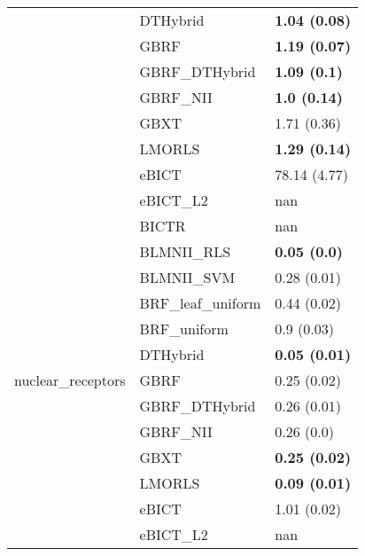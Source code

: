 \begin{tabular}{lll}
 & DTHybrid & \textbf{1.04 (0.08)} \\
 & GBRF & \textbf{1.19 (0.07)} \\
 & GBRF\_DTHybrid & \textbf{1.09 (0.1)} \\
 & GBRF\_NII & \textbf{1.0 (0.14)} \\
 & GBXT & 1.71 (0.36) \\
 & LMORLS & \textbf{1.29 (0.14)} \\
 & eBICT & 78.14 (4.77) \\
 & eBICT\_L2 & nan \\
\cline{1-2}
\multirow[c]{13}{*}{nuclear\_receptors} & BICTR & nan \\
 & BLMNII\_RLS & \textbf{0.05 (0.0)} \\
 & BLMNII\_SVM & 0.28 (0.01) \\
 & BRF\_leaf\_uniform & 0.44 (0.02) \\
 & BRF\_uniform & 0.9 (0.03) \\
 & DTHybrid & \textbf{0.05 (0.01)} \\
 & GBRF & 0.25 (0.02) \\
 & GBRF\_DTHybrid & 0.26 (0.01) \\
 & GBRF\_NII & 0.26 (0.0) \\
 & GBXT & \textbf{0.25 (0.02)} \\
 & LMORLS & \textbf{0.09 (0.01)} \\
 & eBICT & 1.01 (0.02) \\
 & eBICT\_L2 & nan \\
\cline{1-2}
\bottomrule
\end{tabular}
